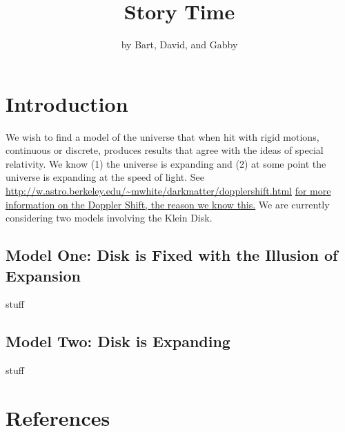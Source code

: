 \documentclass[11pt]{article}
\theoremstyle{plain}
\theoremstyle{definition}
\begin{document}
 


\title{Story Time}
\author{by Bart, David, and Gabby}
\maketitle

\section{Introduction}

We wish to find a model of the universe that when hit with rigid motions, continuous or discrete, produces results that agree with the ideas of special relativity. We know (1) the universe is expanding and (2) at some point the universe is expanding at the speed of light. See 
\url{http://w.astro.berkeley.edu/~mwhite/darkmatter/dopplershift.html} \href{http://w.astro.berkeley.edu/}{for more information on the Doppler Shift, the reason we know this.}
We are currently considering two models involving the Klein Disk. 

\subsection{Model One: Disk is Fixed with the Illusion of Expansion}
stuff

\subsection{Model Two: Disk is Expanding}
stuff 

\section{References}

 
 
\end{document}
